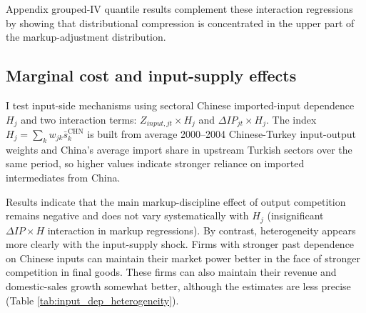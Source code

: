 \documentclass[12pt]{article}
\begin{document}
Appendix grouped-IV quantile results complement these interaction regressions by showing that distributional compression is concentrated in the upper part of the markup-adjustment distribution.


\subsection{Marginal cost and input-supply effects}
I test input-side mechanisms using sectoral Chinese imported-input dependence $H_j$ and two interaction terms: $Z_{input,jt} \times H_j$ and $\Delta IP_{jt} \times H_j$. The index $H_j = \sum_{k} w_{jk} \bar{s}_k^{\text{CHN}}$ is built from average 2000--2004 Chinese-Turkey input-output weights and China's average import share in upstream Turkish sectors over the same period, so higher values indicate stronger reliance on imported intermediates from China.

Results indicate that the main markup-discipline effect of output competition remains negative and does not vary systematically with $H_j$ (insignificant $\Delta IP \times H$ interaction in markup regressions). By contrast, heterogeneity appears more clearly with the input-supply shock. Firms with stronger past dependence on Chinese inputs can maintain their market power better in the face of stronger competition in final goods. These firms can also maintain their revenue and domestic-sales growth somewhat better, although the estimates are less precise (Table \ref{tab:input_dep_heterogeneity}).
\end{document}
